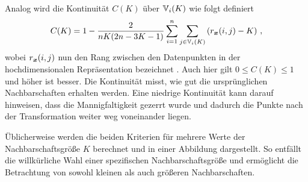Analog wird die Kontinuität $C(K)$ über $\mathbb{V}_i(K)$ wie folgt definiert
\begin{equation}
	C(K) = 1 - \frac{2}{nK(2n - 3K - 1)} \sum_{i = 1}^{n}\sum_{j \in \mathbb{V}_i(K) } \left( r_{\bm{x}}(i, j) - K \right) \, ,
\end{equation}
wobei $r_{\bm{x}}(i, j)$ nun den Rang zwischen den Datenpunkten in der hochdimensionalen Repräsentation bezeichnet \parencite[487]{Venna.2001}. Auch hier gilt $0 \leq C(K) \leq 1$ und höher ist besser. Die Kontinuität
misst, wie gut die ursprünglichen Nachbarschaften erhalten werden. Eine niedrige Kontinuität kann
darauf hinweisen, dass die Mannigfaltigkeit gezerrt wurde und dadurch die Punkte nach der
Transformation weiter weg voneinander liegen.

Üblicherweise werden die beiden Kriterien für mehrere Werte der Nachbarschaftsgröße $K$ berechnet und in einer Abbildung dargestellt. So entfällt die willkürliche Wahl einer spezifischen Nachbarschaftsgröße und ermöglicht die Betrachtung von sowohl kleinen als auch größeren Nachbarschaften.


